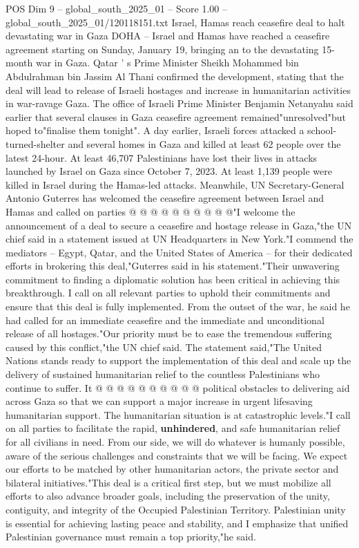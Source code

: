 \begin{textsample}{POS Dim 9 – global\_south\_2025\_01 – Score 1.00 – global\_south\_2025\_01/120118151.txt}  \label{ex:f9_pos_350}
Israel, Hamas reach ceasefire deal to halt devastating war in Gaza DOHA -- Israel and Hamas have reached a ceasefire agreement starting on Sunday, January 19, bringing an to the devastating 15-month war in Gaza.
Qatar ' s Prime Minister Sheikh Mohammed bin Abdulrahman bin Jassim Al Thani confirmed the development, stating that the deal will lead to release of Israeli hostages and increase in humanitarian activities in war-ravage Gaza.
The office of Israeli Prime Minister Benjamin Netanyahu said earlier that several clauses in Gaza ceasefire agreement remained"unresolved"but hoped to"finalise them tonight".
A day earlier, Israeli forces attacked a school-turned-shelter and several homes in Gaza and killed at least 62 people over the latest 24-hour.
At least 46,707 Palestinians have lost their lives in attacks launched by Israel on Gaza since October 7, 2023.
At least 1,139 people were killed in Israel during the Hamas-led attacks.
Meanwhile, UN Secretary-General Antonio Guterres has welcomed the ceasefire agreement between Israel and Hamas and called on parties @ @ @ @ @ @ @ @ @ @"I welcome the announcement of a deal to secure a ceasefire and hostage release in Gaza,"the UN chief said in a statement issued at UN Headquarters in New York."I commend the mediators -- Egypt, Qatar, and the United States of America -- for their dedicated efforts in brokering this deal,"Guterres said in his statement."Their unwavering commitment to finding a diplomatic solution has been critical in achieving this breakthrough.
I call on all relevant parties to uphold their commitments and ensure that this deal is fully implemented.
From the outset of the war, he said he had called for an immediate ceasefire and the immediate and unconditional release of all hostages."Our priority must be to ease the tremendous suffering caused by this conflict,"the UN chief said.
The statement said,"The United Nations stands ready to support the implementation of this deal and scale up the delivery of sustained humanitarian relief to the countless Palestinians who continue to suffer.
It @ @ @ @ @ @ @ @ @ @ political obstacles to delivering aid across Gaza so that we can support a major increase in urgent lifesaving humanitarian support.
The humanitarian situation is at catastrophic levels."I call on all parties to facilitate the rapid, \textbf{unhindered}, and safe humanitarian relief for all civilians in need.
From our side, we will do whatever is humanly possible, aware of the serious challenges and constraints that we will be facing.
We expect our efforts to be matched by other humanitarian actors, the private sector and bilateral initiatives."This deal is a critical first step, but we must mobilize all efforts to also advance broader goals, including the preservation of the unity, contiguity, and integrity of the Occupied Palestinian Territory.
Palestinian unity is essential for achieving lasting peace and stability, and I emphasize that unified Palestinian governance must remain a top priority,"he said.

\end{textsample}
